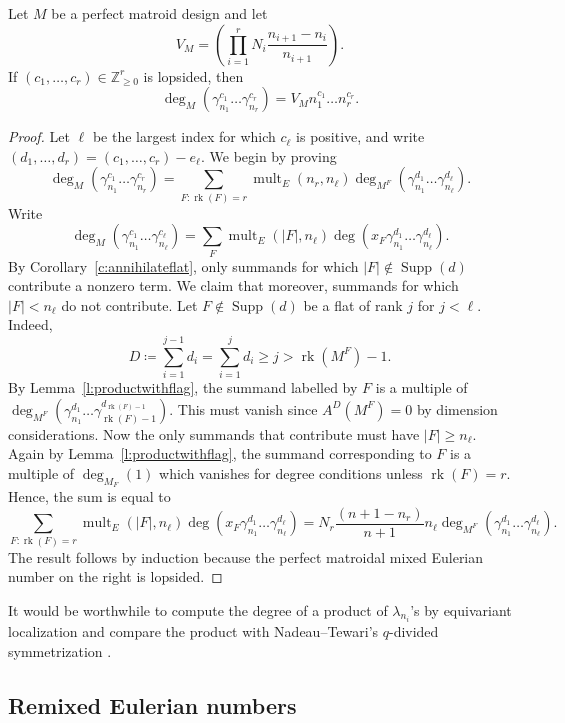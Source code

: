 \documentclass[ALCO,published]{cedram}
\numberwithin{equation}{section}
\numberwithin{figure}{section}
\newcommand{\Z}{\mathbb{Z}}
\DeclareMathOperator{\Supp}{Supp}
\DeclareMathOperator{\mult}{mult}
\DeclareMathOperator{\rk}{rk}
\begin{document}
\begin{lemma} \label{l:lopsided}
   Let $M$ be a perfect matroid design and let 
   \[V_M=\left(\prod_{i=1}^r  N_i 
 \frac{n_{i+1}-n_i}{n_{i+1}}\right).\]
   If $(c_1,\dots,c_r)\in\Z_{\geq 0}^r$ is lopsided, then
 \[\deg_M(\gamma_{n_1}^{c_1}\dots\gamma_{n_r}^{c_r})=V_Mn_1^{c_1}\dots n_r^{c_r}.\]       
\end{lemma}

\begin{proof}
    Let $\ell$ be the largest index for which $c_\ell$ is positive, and 
    write $(d_1,\dots,d_r)=(c_1,\dots,c_r)-e_\ell$.
    We begin by proving
    \[\deg_M(\gamma_{n_1}^{c_1}\dots\gamma_{n_r}^{c_r})=\sum_{F\colon \rk(F)=r} \mult_{E}(n_r,n_\ell)\deg_{M^F}(\gamma_{n_1}^{d_1}\dots\gamma_{n_\ell}^{d_{\ell}}).\]
    Write 
    \[\deg_M(\gamma_{n_1}^{c_1}\dots\gamma_{n_\ell}^{c_{\ell}})
    =\sum_F \mult_{E}(|F|,n_{\ell})\deg(x_F\gamma_{n_1}^{d_1}\dots \gamma_{n_{\ell}}^{d_{\ell}}).
    \]
    By Corollary~\ref{c:annihilateflat}, only summands for which $|F|\notin\Supp(d)$ contribute a nonzero term. We claim that moreover, summands for which $|F|<n_\ell$ do not contribute. 
    Let $F\notin\Supp(d)$ be a flat of rank $j$ for $j<\ell$.
    Indeed,
    \[D\coloneqq \sum_{i=1}^{j-1} d_i =\sum_{i=1}^j d_i\geq j>\rk(M^F)-1.
    \]
    By Lemma~\ref{l:productwithflag}, the summand labelled by $F$ is a multiple of $\deg_{M^F}(\gamma_{n_1}^{d_1}\dots\gamma_{\rk(F)-1}^{d_{\rk(F)-1}})$. This must vanish since $A^D(M^F)=0$ by dimension considerations.
    Now the only summands that contribute must have $|F|\geq n_\ell$. Again by Lemma~\ref{l:productwithflag}, the summand corresponding to $F$ is a multiple of $\deg_{M_F}(1)$ which vanishes for degree conditions unless $\rk(F)=r$.
    Hence, the sum is equal to
    \[\sum_{F\colon \rk(F)=r} \mult_{E}(|F|,n_{\ell})\deg(x_F\gamma_{n_1}^{d_1}\dots \gamma_{n_{\ell}}^{d_{\ell}})
    =N_r\frac{(n+1-n_r)}{n+1}n_{\ell}\deg_{M^F}(\gamma_{n_1}^{d_1}\dots \gamma_{n_{\ell}}^{d_{\ell}}).
    \]
    The result follows by induction because the perfect matroidal mixed Eulerian number on the right is lopsided.
\end{proof}

It would be worthwhile to compute the degree of a product of $\lambda_{n_i}$'s by equivariant localization and compare the product with Nadeau--Tewari's $q$-divided symmetrization \cite{NT:remixed}.


\subsection{Remixed Eulerian numbers}
\end{document}
